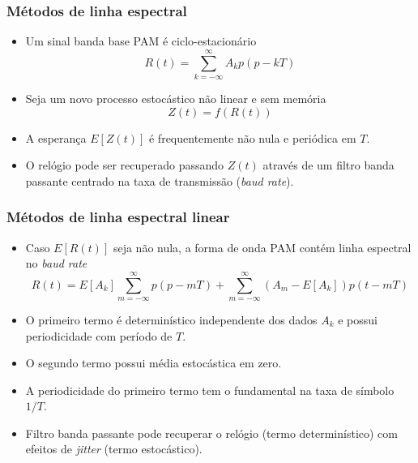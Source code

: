 \begin{frame}
	\frametitle{Métodos de linha espectral}
	
	\begin{itemize}
		\item Um sinal banda base PAM é ciclo-estacionário
		\begin{equation*}
		R(t) = \sum_{k=-\infty}^{\infty} A_kp\left(p-kT\right)
		\end{equation*}
		\item Seja um novo processo estocástico não linear e sem memória
		\begin{equation*}
		Z(t) = f\left(R(t)\right)
		\end{equation*}
		\item A esperança $E\left[Z(t)\right]$ é frequentemente não nula e periódica em $T$.
		\item O relógio pode ser recuperado passando $Z(t)$ através de um filtro banda passante centrado na taxa de transmissão (\textit{baud rate}).
	\end{itemize}			
\end{frame}

\begin{frame}
	\frametitle{Métodos de linha espectral linear}
	
	\begin{itemize}
		\item Caso $E\left[R(t)\right]$ seja não nula, a forma de onda PAM contém linha espectral no \textit{baud rate}
		\begin{equation*}
		R(t) = E[A_k ]\sum_{m=-\infty}^{\infty} p\left(p - mT\right) + \sum_{m=-\infty}^{\infty}\left(A_m - E\left[A_k\right]\right)p\left(t-mT\right)
		\end{equation*}
		\item O primeiro termo é determinístico independente dos dados $A_k$ e possui periodicidade com período de $T$.
		\item O segundo termo possui média estocástica em zero.
		\item A periodicidade do primeiro termo tem o fundamental na taxa de símbolo $1/T$.
		\item Filtro banda passante pode recuperar o relógio (termo determinístico) com efeitos de \textit{jitter} (termo estocástico).
	\end{itemize}			
\end{frame}


